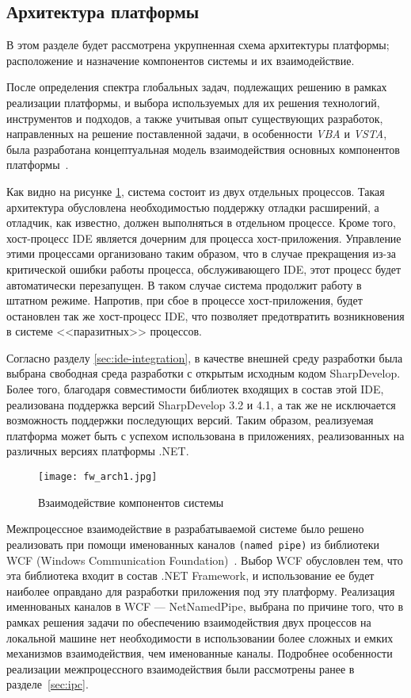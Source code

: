\subsection{Архитектура платформы}

В этом разделе будет рассмотрена укрупненная схема архитектуры платформы; расположение и назначение компонентов системы и их взаимодействие.

После определения спектра глобальных задач, подлежащих решению в рамках реализации платформы, и выбора используемых для их решения технологий, инструментов и подходов, а также учитывая опыт существующих разработок, направленных на решение поставленной задачи, в особенности {\it VBA} и {\it VSTA}, была разработана концептуальная модель взаимодействия основных компонентов платформы~\cite{patterns-of-enterprise-app}.

Как видно на рисунке \ref{fw_arch1}, система состоит из двух отдельных процессов. Такая архитектура обусловлена необходимостью поддержку отладки расширений, а отладчик, как известно, должен выполняться в отдельном процессе. Кроме того, хост-процесс IDE является дочерним для процесса хост-приложения. Управление этими процессами организовано таким образом, что в случае прекращения из-за критической ошибки работы процесса, обслуживающего IDE, этот процесс будет автоматически перезапущен. В таком случае система продолжит работу в штатном режиме. Напротив, при сбое в процессе хост-приложения, будет остановлен так же хост-процесс IDE, что позволяет предотвратить возникновения в системе <<паразитных>> процессов.

Согласно разделу \ref{sec:ide-integration}, в качестве внешней среду разработки была выбрана свободная среда разработки с открытым исходным кодом SharpDevelop. Более того, благодаря совместимости библиотек входящих в состав этой IDE, реализована поддержка версий SharpDevelop 3.2 и 4.1, а так же не исключается возможность поддержки последующих версий. Таким образом, реализуемая платформа может быть с успехом использована в приложениях, реализованных на различных версиях платформы .NET.

\begin{figure}[!h]
    \centering
    \texttt{[image: fw\_arch1.jpg]}
    \caption{Взаимодействие компонентов системы}
    \label{fw_arch1}
\end{figure}

Межпроцессное взаимодействие в разрабатываемой системе было решено реализовать при помощи именованных каналов {\tt (named pipe)} из библиотеки WCF (Windows Communication Foundation)~\cite{wcf-services}. Выбор WCF обусловлен тем, что эта библиотека входит в состав .NET Framework, и использование ее будет наиболее оправдано для разработки приложения под эту платформу. Реализация именнованых каналов в WCF --- NetNamedPipe, выбрана по причине того, что в рамках решения задачи по обеспечению взаимодействия двух процессов на локальной машине нет необходимости в использовании более сложных и емких механизмов взаимодействия, чем именованные каналы. Подробнее особенности реализации межпроцессного взаимодействия были рассмотрены ранее в разделе~\ref{sec:ipc}.

